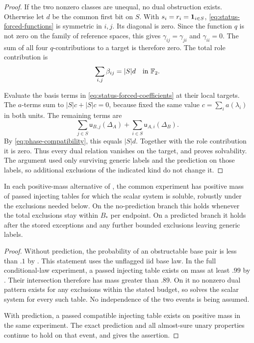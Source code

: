 \begin{proof}
If the two nonzero classes are unequal, no dual obstruction exists.
Otherwise let $d$ be the common first bit on $S$. With
$s_i=r_i=\mathbf 1_{i\in S}$, \eqref{eq:status-forced-functions} is symmetric
in $i,j$. Its diagonal is zero. Since the function $q$ is not zero
on the family of reference spaces, this gives
$\gamma_{ij}=\gamma_{ji}$ and $\gamma_{ii}=0$. The sum of all
four $q$-contributions to a target is therefore zero. The total role
contribution is
\[
\sum_{i,j}\beta_{ij}=|S|d\quad\text{in }\mathbb F_2.
\]

Evaluate the basis terms in
\eqref{eq:status-forced-coefficients} at their local targets.
The $a$-terms sum to $|S|c+|S|c=0$, because
 fixed the same value
$c=\sum_i a(\lambda_i)$ in both units. The remaining terms are
\[
\sum_{j\in S}\mathsf u_{B,j}(\Delta_A)
 +\sum_{i\in S}\mathsf u_{A,i}(\Delta_B).
\]
By \eqref{eq:phase-compatibility}, this equals $|S|d$.
Together with the role contribution it is zero. Thus every dual
relation vanishes on the target, and  proves
solvability. The argument used only surviving generic labels and the
prediction on those labels, so additional exclusions of the indicated
kind do not change it.
\end{proof}

\begin{lemma}
\label{lem:status-span}
In each positive-mass alternative of
, the common experiment has positive mass
of passed injecting tables for which the scalar system is soluble,
robustly under the exclusions needed below. On the no-prediction branch
this holds whenever the total exclusions stay within $B_*$ per endpoint.
On a predicted branch it holds after the stored exceptions and any
further bounded exclusions leaving generic labels.
\end{lemma}

\begin{proof}
Without prediction, the probability of an obstructable base pair is
less than $.1$ by . This statement
uses the unflagged iid base law. In the full conditional-law experiment,
a passed injecting table exists on mass at least $.99$ by
. Their intersection therefore has mass greater
than $.89$. On it no nonzero dual pattern exists for any exclusions
within the stated budget, so  solves the
scalar system for every such table. No independence of the two events
is being assumed.

With prediction, a passed compatible injecting table exists on positive
mass in the same experiment. The exact prediction and all almost-sure
unary properties continue to hold on that event, and
 gives the assertion.
\end{proof}

